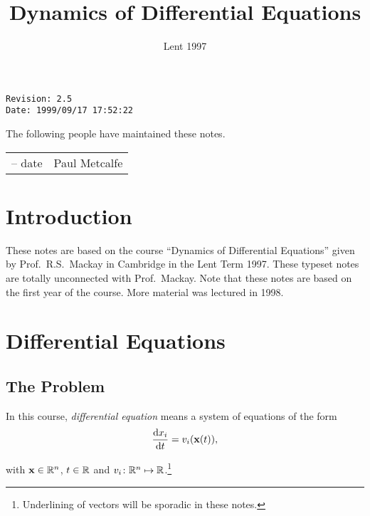 \documentclass{notes}
\theoremstyle{plain}
\begin{document}
\frontmatter

\title{Dynamics of Differential Equations}
\date{Lent 1997} \maketitle

\thispagestyle{empty}

\noindent\verb$Revision: 2.5 $\hfill\\
\noindent\verb$Date: 1999/09/17 17:52:22 $\hfill\\

\vspace{1.5in}

The following people have maintained these notes.

\begin{center}
\begin{tabular}{ r  l}
-- date & Paul Metcalfe
\end{tabular}
\end{center}

\tableofcontents

\chapter{Introduction}

These notes are based on the course ``Dynamics of Differential Equations''
given by Prof.~R.S.~Mackay in Cambridge in the Lent Term 1997.  These
typeset notes are totally unconnected with Prof.~Mackay.
Note that these notes are based on the first year of the course.  More
material was lectured in 1998.

\alsoavailable
\archimcopyright

\mainmatter

\chapter{Differential Equations}

\section{The Problem}

In this course, \emph{differential equation} means a system of equations
of the form
\[
\frac{\mathrm{d} x_i}{\mathrm{d} t} = v_i(\mathbf{x}(t)),
\]

with $\mathbf{x} \in \mathbb{R}^n$, $t \in \mathbb{R}$ and $v_i \colon \mathbb{R}^n \mapsto
\mathbb{R}$.\footnote{Underlining of vectors will be sporadic in these
  notes.}
\end{document}
